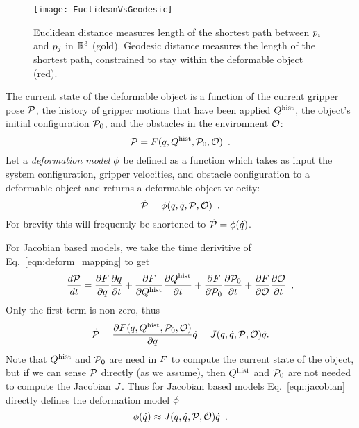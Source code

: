 \begin{figure}[ht]
    \centering
    \texttt{[image: EuclideanVsGeodesic]}
    \caption{Euclidean distance measures length of the shortest path between $p_i$ and $p_j$ in $\mathbb{R}^3$ (gold). Geodesic distance measures the length of the shortest path, constrained to stay within the deformable object (red).}
    \label{fig:geodesic}
\end{figure}

The current state of the deformable object is a function of the current gripper pose $\mathcal{P}$, the history of gripper motions that have been applied $Q^{\textrm{hist}}$, the object's initial configuration $\mathcal{P}_0$, and the obstacles in the environment $\mathcal{O}$:
\begin{equation}
    \mathcal{P} = F(q, Q^{\textrm{hist}}, \mathcal{P}_0, \mathcal{O}) \enspace.
    \label{eqn:deform_mapping}
\end{equation}
Let a \textit{deformation model} $\phi$ be defined as a function which takes as input the system configuration, gripper velocities, and obstacle configuration to a deformable object and returns a deformable object velocity:
\begin{equation}
    \dot{\mathcal{P}} = \phi(q, \dot{q}, \mathcal{P}, \mathcal{O}) \enspace .
\end{equation}
For brevity this will frequently be shortened to $\dot{\mathcal{P}} = \phi(\dot{q})$.

For Jacobian based models, we take the time derivitive of Eq.~\eqref{eqn:deform_mapping} to get
\begin{equation}
\frac{d \mathcal{P}}{d t} = 
    \frac{\partial F}{\partial q}  \frac{\partial q}{\partial t} + 
    \frac{\partial F}{\partial Q^{\textrm{hist}}}\frac{\partial Q^{\textrm{hist}}}{\partial t} + 
    \frac{\partial F}{\partial \mathcal{P}_0} \frac{\partial \mathcal{P}_0}{\partial t} +
    \frac{\partial F}{\partial \mathcal{O}}       \frac{\partial \mathcal{O}}{\partial t} \enspace .
\end{equation}
Only the first term is non-zero, thus
\begin{equation}
    \dot{\mathcal{P}} = \frac{\partial F(q, Q^{\textrm{hist}}, \mathcal{P}_0, \mathcal{O})}{\partial q} \dot{q} = J(q, \dot{q}, \mathcal{P}, \mathcal{O}) \dot{q}.
    \label{eqn:jacobian}
\end{equation}
Note that $Q^{\textrm{hist}}$ and $\mathcal{P}_0$ are need in $F$ to compute the current state of the object, but if we can sense $\mathcal{P}$ directly (as we assume), then $Q^{\textrm{hist}}$ and $\mathcal{P}_0$ are not needed to compute the Jacobian $J$. Thus for Jacobian based models Eq.~\eqref{eqn:jacobian} directly defines the deformation model $\phi$
\begin{equation}
    \phi(\dot{q}) \approx J(q, \dot{q}, \mathcal{P}, \mathcal{O}) \dot{q} \enspace.
    \label{eqn:jacobianforwardfunction}
\end{equation}

